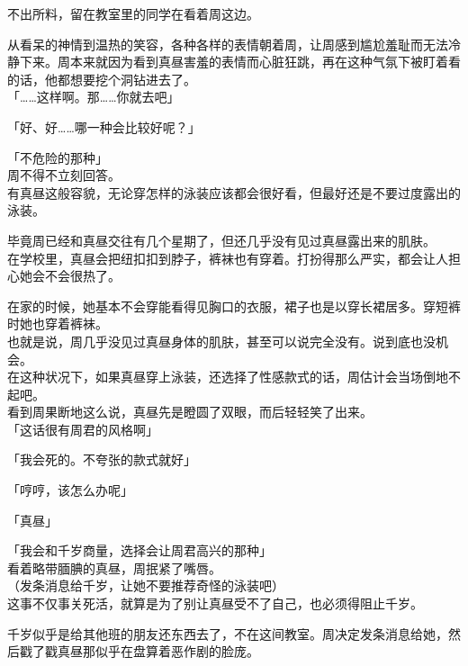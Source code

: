 不出所料，留在教室里的同学在看着周这边。

从看呆的神情到温热的笑容，各种各样的表情朝着周，让周感到尴尬羞耻而无法冷静下来。周本来就因为看到真昼害羞的表情而心脏狂跳，再在这种气氛下被盯着看的话，他都想要挖个洞钻进去了。\\

「……这样啊。那……你就去吧」

「好、好……哪一种会比较好呢？」

「不危险的那种」\\

周不得不立刻回答。\\

有真昼这般容貌，无论穿怎样的泳装应该都会很好看，但最好还是不要过度露出的泳装。

毕竟周已经和真昼交往有几个星期了，但还几乎没有见过真昼露出来的肌肤。\\

在学校里，真昼会把纽扣扣到脖子，裤袜也有穿着。打扮得那么严实，都会让人担心她会不会很热了。

在家的时候，她基本不会穿能看得见胸口的衣服，裙子也是以穿长裙居多。穿短裤时她也穿着裤袜。\\

也就是说，周几乎没见过真昼身体的肌肤，甚至可以说完全没有。说到底也没机会。\\

在这种状况下，如果真昼穿上泳装，还选择了性感款式的话，周估计会当场倒地不起吧。\\

看到周果断地这么说，真昼先是瞪圆了双眼，而后轻轻笑了出来。\\

「这话很有周君的风格啊」

「我会死的。不夸张的款式就好」

「哼哼，该怎么办呢」

「真昼」

「我会和千岁商量，选择会让周君高兴的那种」\\

看着略带腼腆的真昼，周抿紧了嘴唇。\\

（发条消息给千岁，让她不要推荐奇怪的泳装吧）\\

这事不仅事关死活，就算是为了别让真昼受不了自己，也必须得阻止千岁。

千岁似乎是给其他班的朋友还东西去了，不在这间教室。周决定发条消息给她，然后戳了戳真昼那似乎在盘算着恶作剧的脸庞。
